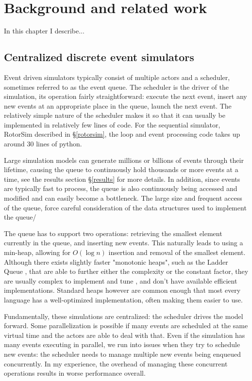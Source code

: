 \chapter{Background and related work} \label{background}

In this chapter I describe...

\section{Centralized discrete event simulators} \label{centralized-sim}

Event driven simulators typically consist of multiple actors and a scheduler, sometimes referred to as the event queue. %
The scheduler is the driver of the simulation, its operation fairly straightforward: execute the next event, insert any new events at an appropriate place in the queue, launch the next event.
The relatively simple nature of the scheduler makes it so that it can usually be implemented in relatively few lines of code.
For the sequential simulator, RotorSim\cite{brode-roger_nibriviarotorsim_2020} described in \S \ref{rotorsim}, the loop and event processing code takes up around 30 lines of python.

Large simulation models can generate millions or billions of events through their lifetime, causing the queue to continuously hold thousands or more events at a time, see the results section \S\ref{results} for more details.
In addition, since events are typically fast to process, the queue is also continuously being accessed and modified and can easily become a bottleneck.
The large size and frequent access of the queue, force careful consideration of the data structures used to implement the queue/

The queue has to support two operations: retrieving the smallest element currently in the queue, and inserting new events.
This naturally leads to using a min-heap, allowing for $O\left(\log n\right)$ insertion and removal of the smallest element.
Although there exists slightly faster "monotonic heaps", such as the Ladder Queue \cite{tang_ladder_2005}, that are able to further either the complexity or the constant factor, they are usually complex to implement and tune \cite{furfaro_adaptive_2018}, and don't have available efficient implementations.
Standard heaps however are common enough that most every language has a well-optimized implementation, often making them easier to use.

Fundamentally, these simulations are centralized: the scheduler drives the model forward.
Some parallelization is possible if many events are scheduled at the same virtual time and the actors are able to deal with that.
Even if the simulation has many events executing in parallel, we run into issues when they try to schedule new events: the scheduler needs to manage multiple new events being enqueued concurrently.
In my experience, the overhead of managing these concurrent operations results in worse performance overall.

